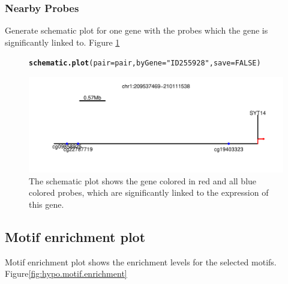 \documentclass{article}\usepackage[]{graphicx}\usepackage[usenames,dvipsnames]{color}
\makeatletter
\def\maxwidth{ %
  \ifdim\Gin@nat@width>\linewidth
    \linewidth
  \else
    \Gin@nat@width
  \fi
}
\newcommand{\hlnum}[1]{\textcolor[rgb]{0.686,0.059,0.569}{#1}}%
\newcommand{\hlstr}[1]{\textcolor[rgb]{0.192,0.494,0.8}{#1}}%
\newcommand{\hlstd}[1]{\textcolor[rgb]{0.345,0.345,0.345}{#1}}%
\newcommand{\hlkwc}[1]{\textcolor[rgb]{0.333,0.667,0.333}{#1}}%
\newcommand{\hlkwd}[1]{\textcolor[rgb]{0.737,0.353,0.396}{\textbf{#1}}}%
\newenvironment{kframe}{%
 \def\at@end@of@kframe{}%
 \ifinner\ifhmode%
  \def\at@end@of@kframe{\end{minipage}}%
  \begin{minipage}{\columnwidth}%
 \fi\fi%
 \def\FrameCommand##1{\hskip\@totalleftmargin \hskip-\fboxsep
 \colorbox{shadecolor}{##1}\hskip-\fboxsep
     \hskip-\linewidth \hskip-\@totalleftmargin \hskip\columnwidth}%
 \MakeFramed {\advance\hsize-\width
   \@totalleftmargin\z@ \linewidth\hsize
   \@setminipage}}%
 {\par\unskip\endMakeFramed%
 \at@end@of@kframe}
\newenvironment{knitrout}{}{} %
\makeatother
\begin{document}
\subsubsection{Nearby Probes}
Generate schematic plot for one gene with the probes which the gene is significantly 
linked to. Figure \ref{fig:figure5}
\begin{figure}[H]
\begin{knitrout}
\color{fgcolor}\begin{kframe}
\begin{alltt}
\hlkwd{schematic.plot}\hlstd{(}\hlkwc{pair}\hlstd{=pair,} \hlkwc{byGene}\hlstd{=}\hlstr{"ID255928"}\hlstd{,}\hlkwc{save}\hlstd{=}\hlnum{FALSE}\hlstd{)}
\end{alltt}
\end{kframe}

{\centering \includegraphics[width=\maxwidth]{figure/figure5-1} 

}



\end{knitrout}
\protect\caption{The schematic plot shows the gene 
colored in red and all blue colored probes, which are significantly linked to the 
expression of this gene.
\label{fig:figure5}}
\end{figure}


\subsection{Motif enrichment plot}
Motif enrichment plot shows the enrichment levels for the selected motifs. Figure\ref{fig:hypo.motif.enrichment}
\end{document}
